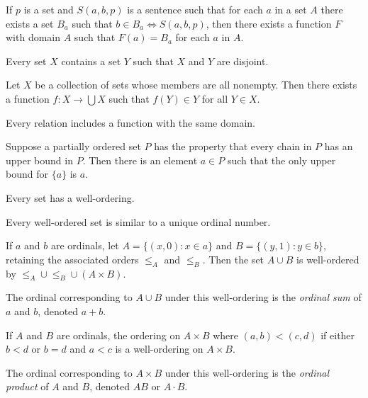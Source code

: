\begin{axiom}[Substitution]
  If $p$ is a set and 
  $S(a,b,p)$ is a sentence such that for each $a$ in a set $A$ there exists a
  set $B_a$ such that $b\in B_a\iff S(a,b,p)$, then there exists a function $F$
  with domain $A$ such that $F(a)=B_a$ for each $a$ in $A$.
\end{axiom}
\begin{axiom}[Foundation]
  Every set $X$ contains a set $Y$ such that $X$ and $Y$ are disjoint.
\end{axiom}
\begin{axiom}[Choice]
  Let $X$ be a collection of sets whose members are all nonempty. Then there exists a
  function $f:X\to\bigcup X$ such that $f(Y)\in Y$ for all $Y\in X$.
\end{axiom}
\begin{prop}
  Every relation includes a function with the same domain.
\end{prop}
\begin{thm}
  Suppose a partially ordered set $P$ has the property that every chain in $P$
  has an upper bound in $P$. Then there is an element $a\in P$ such that the
  only upper bound for $\{a\}$ is $a$.
\end{thm}
\begin{thm}
  Every set has a well-ordering.
\end{thm}
\begin{prop}
  Every well-ordered set is similar to a unique ordinal number.
\end{prop}
\begin{prop}
  If $a$ and $b$ are ordinals, let $A=\{(x,0):x\in a\}$ and $B=\{(y,1):y\in
  b\}$, retaining the associated orders $\le_A$ and $\le_B$. Then the set $A\cup
  B$ is well-ordered by $\le_A\cup\le_B\cup(A\times B)$.
\end{prop}
\begin{defn}
  The ordinal corresponding to $A\cup B$ under this well-ordering is the
  \emph{ordinal sum} of $a$ and $b$, denoted $a+b$.
\end{defn}
\begin{prop}
  If $A$ and $B$ are ordinals, the ordering on $A\times B$ where $(a,b)<(c,d)$
  if either $b<d$ or $b=d$ and $a<c$ is a well-ordering on $A\times B$.
\end{prop}
\begin{defn}
  The ordinal corresponding to $A\times B$ under this well-ordering is the
  \emph{ordinal product} of $A$ and $B$, denoted $AB$ or $A\cdot B$.
\end{defn}
